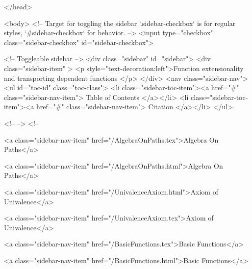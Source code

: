   
</head>




  <body>
    <!-- Target for toggling the sidebar `.sidebar-checkbox` is for regular
     styles, `#sidebar-checkbox` for behavior. -->
<input type="checkbox" class="sidebar-checkbox" id="sidebar-checkbox">

<!-- Toggleable sidebar -->
<div class="sidebar" id="sidebar">
  <div class="sidebar-item" >
    <p style="text-decoration:left">Function extensionality and transporting dependent functions </p>
  </div>
  <nav class="sidebar-nav">
    <ul id="toc-id" class="toc-class">
  <li class="sidebar-toc-item"><a href="#" class="sidebar-nav-item"> Table of Contents </a></li>
  <li class="sidebar-toc-item"><a href="#" class="sidebar-nav-item"> Citation </a></li>
</ul>


    <!--  -->
    <!-- 
      
    
      
    
      
    
      
        
      
    
      
        
          <a class="sidebar-nav-item" href="/AlgebraOnPaths.tex">Algebra On Paths</a>
        
      
    
      
        
          <a class="sidebar-nav-item" href="/AlgebraOnPaths.html">Algebra On Paths</a>
        
      
    
      
        
          <a class="sidebar-nav-item" href="/UnivalenceAxiom.html">Axiom of Univalence</a>
        
      
    
      
        
          <a class="sidebar-nav-item" href="/UnivalenceAxiom.tex">Axiom of Univalence</a>
        
      
    
      
        
          <a class="sidebar-nav-item" href="/BasicFunctions.tex">Basic Functions</a>
        
      
    
      
        
          <a class="sidebar-nav-item" href="/BasicFunctions.html">Basic Functions</a>
        
      
    
